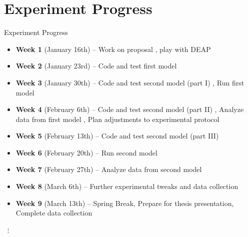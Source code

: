 \section{Experiment Progress}

\begin{frame}{Experiment Progress}
\begin{itemize}
  \item \textbf{Week 1} (January 16th) -- Work on proposal \checkmark, play with DEAP \checkmark
  \item \textbf{Week 2} (January 23rd) -- Code and test first model \checkmark
  \item \textbf{Week 3} (January 30th) -- Code and test second model (part I) , Run first model \checkmark
  \item \textbf{Week 4} (February 6th) -- Code and test second model (part II) , Analyze data from first model \checkmark, Plan adjustments to experimental protocol \checkmark
  \item \textbf{Week 5} (February 13th) -- Code and test second model (part III) 
  \item \textbf{Week 6} (February 20th) -- Run second model
  \item \textbf{Week 7} (February 27th) -- Analyze data from second model
  \item \textbf{Week 8} (March 6th) -- Further experimental tweaks and data collection
  \item \textbf{Week 9} (March 13th) -- Spring Break, Prepare for thesis presentation, Complete data collection
\end{itemize}
\vspace{-1ex}
\begin{center}
{\centering ~$\bm{\vdots}$~}
\end{center}
\end{frame}